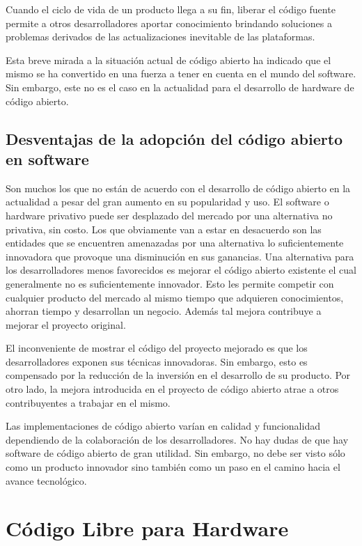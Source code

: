 Cuando el ciclo de vida de un producto llega a su fin, liberar el
código fuente permite a otros desarrolladores aportar conocimiento
brindando soluciones a problemas derivados de las actualizaciones
inevitable de las plataformas.

Esta breve mirada a la situación actual de código abierto ha indicado
que el mismo se ha convertido en una fuerza a tener en cuenta en el
mundo del software. Sin embargo, este no es el caso en la actualidad
para el desarrollo de hardware de código abierto.

\subsection{Desventajas de la adopción del código abierto en software}

Son muchos los que no están de acuerdo con el desarrollo de código
abierto en la actualidad a pesar del gran aumento en su popularidad y
uso. El software o hardware privativo puede ser desplazado del mercado
por una alternativa no privativa, sin costo. Los que obviamente van a
estar en desacuerdo son las entidades que se encuentren amenazadas por
una alternativa lo suficientemente innovadora que provoque una
disminución en sus ganancias. Una alternativa para los desarrolladores
menos favorecidos es mejorar el código abierto existente el cual
generalmente no es suficientemente innovador. Esto les permite
competir con cualquier producto del mercado al mismo tiempo que
adquieren conocimientos, ahorran tiempo y desarrollan un
negocio. Además tal mejora contribuye a mejorar el proyecto original.

El inconveniente de mostrar el código del proyecto mejorado es que los
desarrolladores exponen sus técnicas innovadoras. Sin embargo, esto es
compensado por la reducción de la inversión en el desarrollo de su
producto. Por otro lado, la mejora introducida en el proyecto de
código abierto atrae a otros contribuyentes a trabajar en el mismo.

Las implementaciones de código abierto varían en calidad y
funcionalidad dependiendo de la colaboración de los
desarrolladores. No hay dudas de que hay software de código abierto de
gran utilidad. Sin embargo, no debe ser visto sólo como un producto
innovador sino también como un paso en el camino hacia el avance
tecnológico.

\section{Código Libre para Hardware}

